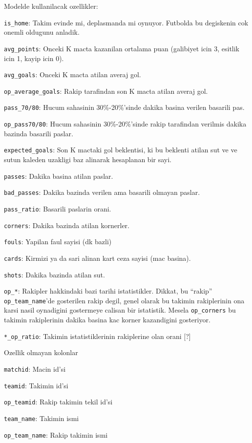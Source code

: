 \documentclass[12pt,fleqn]{article}\usepackage{../common}
\begin{document}
Modelde kullanilacak ozellikler:

\verb!is_home!: Takim evinde mi, deplasmanda mi oynuyor. Futbolda bu
degiskenin cok onemli oldugunu anladik.

\verb!avg_points!: Onceki K macta kazanilan ortalama puan (galibiyet icin
3, esitlik icin 1, kayip icin 0). 

\verb!avg_goals!: Onceki K macta atilan averaj gol.

\verb!op_average_goals!: Rakip tarafindan son K macta atilan averaj gol.

\verb!pass_70/80!: Hucum sahasinin 30\%-20\%'sinde dakika basina verilen
basarili pas.

\verb!op_pass70/80!: Hucum sahasinin 30\%-20\%'sinde rakip tarafindan
verilmis dakika bazinda basarili paslar.

\verb!expected_goals!: Son K mactaki gol beklentisi, ki bu beklenti atilan
sut ve ve sutun kaleden uzakligi baz alinarak hesaplanan bir sayi.

\verb!passes!: Dakika basina atilan paslar.

\verb!bad_passes!: Dakika bazinda verilen ama basarili olmayan paslar.

\verb!pass_ratio!: Basarili paslarin orani.

\verb!corners!: Dakika bazinda atilan kornerler.

\verb!fouls!: Yapilan faul sayisi (dk bazli)

\verb!cards!: Kirmizi ya da sari alinan kart ceza sayisi (mac basina).

\verb!shots!: Dakika bazinda atilan sut.

\verb!op_*!: Rakipler hakkindaki bazi tarihi istatistikler. Dikkat, bu
``rakip'' \verb!op_team_name!'de gosterilen rakip degil, genel olarak bu
takimin rakiplerinin ona karsi nasil oynadigini gostermeye calisan bir
istatistik. Mesela \verb!op_corners! bu takimin rakiplerinin dakika basina
kac korner kazandigini gosteriyor.

\verb!*_op_ratio!: Takimin istatistiklerinin rakiplerine olan orani [?]

Ozellik olmayan kolonlar

\verb!matchid!: Macin id'si

\verb!teamid!: Takimin id'si

\verb!op_teamid!: Rakip takimin tekil id'si

\verb!team_name!: Takimin ismi

\verb!op_team_name!: Rakip takimin ismi
\end{document}

